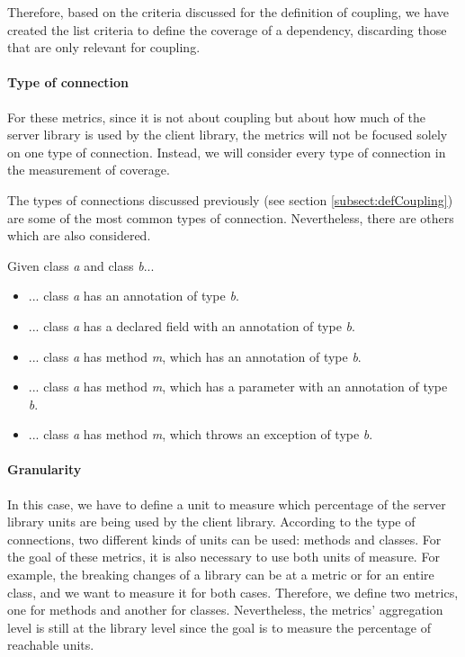 Therefore, based on the criteria discussed for the definition of coupling, we have created the list criteria to define the coverage of a dependency, discarding those that are only relevant for coupling.

\paragraph{Type of connection}
For these metrics, since it is not about coupling but about how much of the server library is used by the client library, the metrics will not be focused solely on one type of connection. Instead, we will consider every type of connection in the measurement of coverage.

The types of connections discussed previously (see section \ref{subsect:defCoupling}) are some of the most common types of connection. Nevertheless, there are others which are also considered.

Given class \textit{a} and class \textit{b}...

\begin{itemize}
  \item ... class \textit{a} has an annotation of type \textit{b}.
  \item ... class \textit{a} has a declared field with an annotation of type \textit{b}.
  \item ... class \textit{a} has method \textit{m}, which has an annotation of type \textit{b}.
  \item ... class \textit{a} has method \textit{m}, which has a parameter with an annotation of type \textit{b}.
  \item ... class \textit{a} has method \textit{m}, which throws an exception of type \textit{b}.
\end{itemize}

\paragraph{Granularity}
In this case, we have to define a unit to measure which percentage of the server library units are being used by the client library. According to the type of connections, two different kinds of units can be used: methods and classes. For the goal of these metrics, it is also necessary to use both units of measure. For example, the breaking changes of a library can be at a metric or for an entire class, and we want to measure it for both cases. Therefore, we define two metrics, one for methods and another for classes. Nevertheless, the metrics' aggregation level is still at the library level since the goal is to measure the percentage of reachable units.

